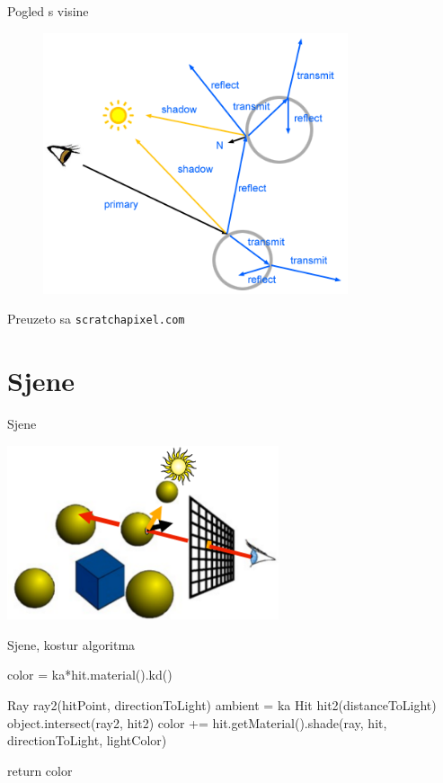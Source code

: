 \documentclass[9pt]{beamer}
\begin{document}
\begin{frame}{Pogled s visine}
\begin{figure}
	\includegraphics[width=0.8\textwidth]{./slike/rt-recursive.png}
\end{figure}
\tiny{Preuzeto sa \texttt{scratchapixel.com}}
\end{frame}

\section{Sjene}

\begin{frame}{Sjene}
\begin{center}
	\includegraphics[width=8cm]{slike/sjene_01.png}
\end{center}

\end{frame}

\begin{frame}{Sjene, kostur algoritma}
\begin{algorithm*}[H]
color = ka*hit.material().kd()\;
{
	Ray ray2(hitPoint, directionToLight)\;
	ambient = ka\;
	Hit hit2(distanceToLight)\;
	{
		object.intersect(ray2, hit2)\;
		{
			color += hit.getMaterial().shade(ray, hit, directionToLight, lightColor)\;
		}
	}
	
}
return color\;
\end{algorithm*}
\end{frame}
\end{document}

